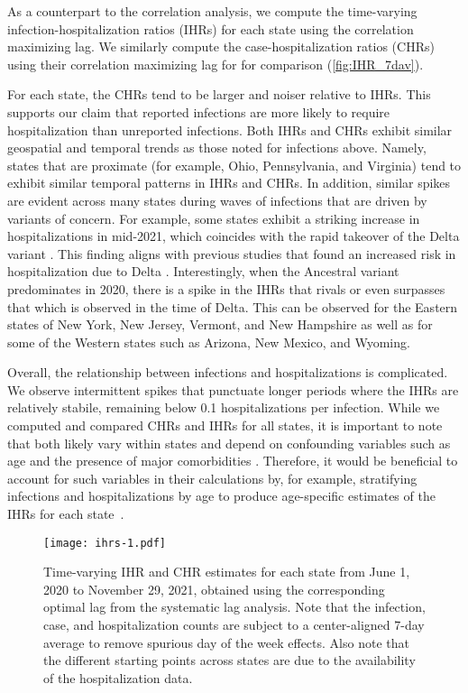 As a counterpart to the correlation analysis, we compute the time-varying
infection-hospitalization ratios (IHRs) for each state using the correlation
maximizing lag. We similarly compute the case-hospitalization ratios (CHRs)
using their correlation maximizing lag for for comparison
(\autoref{fig:IHR_7dav}). 

For each state, the CHRs tend to be larger and noiser relative to IHRs. This
supports our claim that reported infections are more likely to require
hospitalization than unreported infections. Both IHRs and CHRs exhibit similar
geospatial and temporal trends as those noted for infections above. Namely,
states that are proximate (for example, Ohio, Pennsylvania, and Virginia) tend
to exhibit similar temporal patterns in IHRs and CHRs. In addition, similar
spikes are evident across many states during waves of infections that are driven
by variants of concern. For example, some states exhibit a striking increase in
hospitalizations in mid-2021, which coincides with the rapid takeover of the Delta
variant \citep{hodcroft2021covariants}. This finding aligns with previous
studies that found an increased risk in hospitalization due to Delta
\citep{twohig2022hospital, nyberg2022comparative}. Interestingly, when the 
Ancestral variant predominates in 2020, there is a spike in the IHRs that rivals or even surpasses 
that which is observed in the time of Delta. This can be observed for the Eastern states of 
New York, New Jersey, Vermont, and New Hampshire as well as for some of the 
Western states such as Arizona, New Mexico, and Wyoming.

Overall, the relationship between infections and hospitalizations is
complicated. We observe intermittent spikes that punctuate longer periods where
the IHRs are relatively stabile, remaining below 0.1 hospitalizations per
infection. While we computed and compared CHRs and IHRs for all states, it is important to
note that both likely vary within states and depend on confounding variables
such as age and the presence of major comorbidities
\citep{russell2023comorbidities}. Therefore, it would be beneficial to account
for such variables in their calculations by, for example, stratifying infections
and hospitalizations by age to produce age-specific estimates of the IHRs for
each state~\citep{fox2023disproportionate}.



\begin{figure}[!tb]
\centering
\texttt{[image: ihrs-1.pdf]}
\caption{Time-varying IHR and CHR estimates for each state from June 1, 2020
to November 29, 2021, obtained using the corresponding optimal lag from the
systematic lag analysis. Note that the infection, case, and hospitalization
counts are subject to a center-aligned 7-day average to remove spurious day
of the week effects. Also note that the different starting points across
states are due to the availability of the hospitalization data.}
\label{fig:IHR_7dav}
\end{figure}


